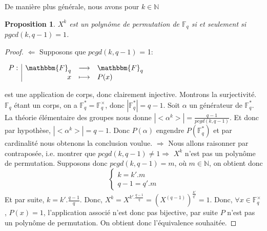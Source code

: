 \documentclass[12pt]{article}
\newcommand{\F}{\mathbbm{F}}
\newtheorem{prop}{Proposition}
\theoremstyle{definition}
\begin{document}
De manière plus générale, nous avons pour $k \in \mathds{N}$

\begin{prop}
$X^k$ est un polynôme de permutation de $\mathds{F}_q$ si et seulement si $pgcd(k, q-1) = 1$.
\end{prop}

\begin{proof}

$\Leftarrow$ Supposons que $pcgd(k,q-1)$ = 1:
\begin{center}
$
\begin{array}{l|rcl}
\displaystyle
P : & \F _q & \longrightarrow & \F _q \\
    & x & \longmapsto & P(x)
\end{array}
$
\end{center}
est une application de corps, donc clairement injective. Montrons la surjectivité.\newline
$\mathds{F}_q$ étant un corps, on a $\mathds{F}_q^* = \mathds{F}_q^{\times}$, donc $|\mathds{F}_q^*| = q-1$. Soit $\alpha$ un générateur de $\mathds{F}_q^*$. La théorie élémentaire des groupes nous donne $|<\alpha^k>| = \frac{q-1}{pcgd(k,q-1)}$. Et donc par hypothèse, $|<\alpha^k>| =  q-1$.  Donc $P(\alpha)$ engendre $P(\mathds{F}_q^*)$ et par cardinalité nous obtenons la conclusion voulue.\newline
$\Rightarrow$ Nous allons raisonner par contraposée, i.e. montrer que $pcgd(k,q-1) \ne 1 \Rightarrow$ $X^k$ n'est pas un polynôme de permutation.\newline
Supposons donc $pcgd(k,q-1) = m$, où $m \in \mathds{N}$, on obtient donc 
$$
\left\{
    \begin{array}{ll}
        k = k'.m \\
        q-1 = q'.m
    \end{array}
\right.
$$
Et par suite, $k  =k'.\frac{q-1}{q}$.\newline
Donc, $X^k = X^{k'.\frac{q-1}{q}} = (X^{(q-1)})^{\frac{k'}{q'}} = 1$. Donc, $\forall x \in \mathds{F}_q^{\times}$, $P(x) = 1$, l'application associé n'est donc pas bijective, par suite $P$ n'est pas un polynôme de permutation. \newline
On obtient donc l'équivalence souhaitée.
\end{proof}
\end{document}
